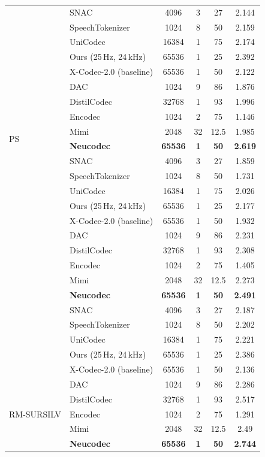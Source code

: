\documentclass[preprint]{article}
\begin{document}
\begin{longtable}{llcccc}
  & SNAC & 4096 & 3 & 27 & 2.144 \\
  & SpeechTokenizer & 1024 & 8 & 50 & 2.159 \\
  & UniCodec & 16384 & 1 & 75 & 2.174 \\
  & Ours (25\,Hz, 24\,kHz) & 65536 & 1 & 25 & 2.392 \\
  & X-Codec-2.0 (baseline) & 65536 & 1 & 50 & 2.122 \\
\midrule
\multirow{8}{*}{PS}
  & DAC & 1024 & 9 & 86 & 1.876 \\
  & DistilCodec & 32768 & 1 & 93 & 1.996 \\
  & Encodec & 1024 & 2 & 75 & 1.146 \\
  & Mimi & 2048 & 32 & 12.5 & 1.985 \\
  & \textbf{Neucodec} & \textbf{65536} & \textbf{1} & \textbf{50} & \textbf{2.619} \\
  & SNAC & 4096 & 3 & 27 & 1.859 \\
  & SpeechTokenizer & 1024 & 8 & 50 & 1.731 \\
  & UniCodec & 16384 & 1 & 75 & 2.026 \\
  & Ours (25\,Hz, 24\,kHz) & 65536 & 1 & 25 & 2.177 \\
  & X-Codec-2.0 (baseline) & 65536 & 1 & 50 & 1.932 \\
\newpage
\multirow{8}{*}{PT}
  & DAC & 1024 & 9 & 86 & 2.231 \\
  & DistilCodec & 32768 & 1 & 93 & 2.308 \\
  & Encodec & 1024 & 2 & 75 & 1.405 \\
  & Mimi & 2048 & 32 & 12.5 & 2.273 \\
  & \textbf{Neucodec} & \textbf{65536} & \textbf{1} & \textbf{50} & \textbf{2.491} \\
  & SNAC & 4096 & 3 & 27 & 2.187 \\
  & SpeechTokenizer & 1024 & 8 & 50 & 2.202 \\
  & UniCodec & 16384 & 1 & 75 & 2.221 \\
  & Ours (25\,Hz, 24\,kHz) & 65536 & 1 & 25 & 2.386 \\
  & X-Codec-2.0 (baseline) & 65536 & 1 & 50 & 2.136 \\
\midrule
\multirow{8}{*}{RM-SURSILV}
  & DAC & 1024 & 9 & 86 & 2.286 \\
  & DistilCodec & 32768 & 1 & 93 & 2.517 \\
  & Encodec & 1024 & 2 & 75 & 1.291 \\
  & Mimi & 2048 & 32 & 12.5 & 2.49 \\
  & \textbf{Neucodec} & \textbf{65536} & \textbf{1} & \textbf{50} & \textbf{2.744} \\

\end{longtable}
\end{document}
